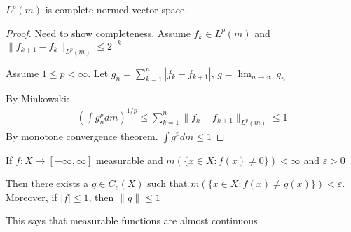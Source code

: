  \begin{theorem}
 	$L^{p}(m)$ is complete normed vector space.
 \end{theorem}
 
 \begin{proof}
 	Need to show completeness.
Assume $f_{k} \in L^{p} (m)$ and 
$\| f_{k + 1} - f_{k} \|_{L^{p} (m)} \leq 2^{-k}$

Assume $1 \leq p < \infty$. Let  $g_{n} = \sum_{k=1}^{n} | f_{k}- f_{k+1} |$, $g = \lim_{n \to \infty} g_{n}$

By Minkowski:
\begin{align*}
	\left( \int g_{n}^{p} dm \right)^{1/p} \leq \sum_{k=1}^{n} \|f_{k} - f_{k+1} \|_{L^{p}(m)} \leq 1
\end{align*} By monotone convergence theorem. $\int g^p dm \leq 1$ 
 \end{proof}
 


 
 \begin{theorem}[Lusin]
	 If $f: X \to [-\infty, \infty]$  measurable and $m(\{x \in X : f(x) \neq 0 \} ) < \infty$ and  $\varepsilon > 0$

	 Then there exists a $g \in C_{c} (X) $ such that $m( \{ x \in X : f(x) \neq g(x) \} ) < \varepsilon$.
	 Moreover, if $|f| \leq 1$, then $ \|g\| \leq 1$
 \end{theorem}
 
 \begin{remark}
 	This says that measurable functions are almost continuous.
 \end{remark}
 
 
